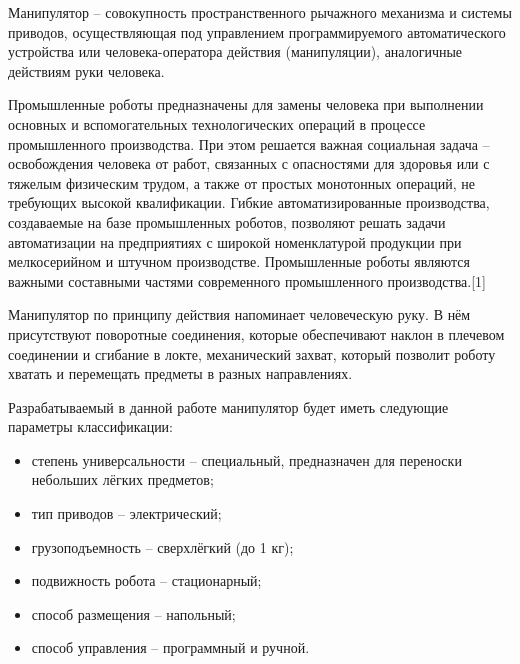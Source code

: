 Манипулятор – совокупность пространственного рычажного механизма и системы приводов, осуществляющая под управлением программируемого автоматического устройства или человека-оператора действия (манипуляции), аналогичные действиям руки человека.

Промышленные роботы предназначены для замены человека при выполнении основных и вспомогательных технологических операций в процессе промышленного производства. При этом решается важная социальная задача -- освобождения человека от работ, связанных с опасностями для здоровья или с тяжелым физическим трудом, а также от простых монотонных операций, не требующих высокой квалификации. Гибкие автоматизированные производства, создаваемые на базе промышленных роботов, позволяют решать задачи автоматизации на предприятиях с широкой номенклатурой продукции при мелкосерийном и штучном производстве. Промышленные роботы являются важными составными частями современного промышленного производства.[1]

Манипулятор по принципу действия напоминает человеческую руку. В нём присутствуют поворотные соединения, которые обеспечивают наклон в плечевом соединении и сгибание в локте, механический захват, который позволит роботу хватать и перемещать предметы в разных направлениях.

Разрабатываемый в данной работе манипулятор будет иметь следующие параметры классификации:

\begin{itemize}
\item степень универсальности – специальный, предназначен для переноски небольших лёгких предметов;
\item тип приводов – электрический;
\item грузоподъемность – сверхлёгкий (до 1 кг);
\item подвижность робота – стационарный;
\item способ размещения – напольный;
\item способ управления – программный и ручной.
\end{itemize}